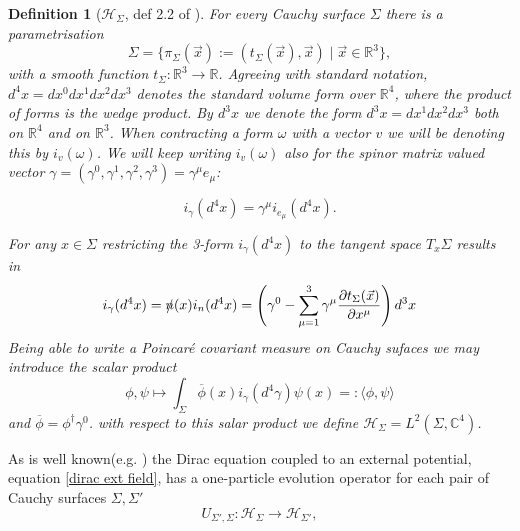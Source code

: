 \documentclass[b5paper,draft,openbib,12pt]{memoir}
\newtheorem{Def}{Definition}
\begin{document}
\begin{Def}[\(\mathcal{H}_\Sigma\), def 2.2 of \cite{deckert2016perspective}]
For every Cauchy surface \(\Sigma\) there is a parametrisation
\begin{equation}
\Sigma= \{ \pi_\Sigma(\vec{x}):=(t_\Sigma(\vec{x}),\vec{x})\mid \vec{x}\in\mathbb{R}^3\},
\end{equation}
with a smooth function 
\(t_\Sigma: \mathbb{R}^3\rightarrow \mathbb{R}\). 
Agreeing with standard notation, 
\(d^4x=dx^0dx^1dx^2dx^3\) denotes the standard volume form over 
\(\mathbb{R}^4\),
where the product of forms is 
the wedge product. By \(d^3x\) we denote 
the form \(d^3x=dx^1dx^2dx^3\) both on \(\mathbb{R}^4\) and 
on \(\mathbb{R}^3\). When contracting a form 
\(\omega\) with a vector \(v\) we 
will be denoting this by \(i_v(\omega)\). 
We will keep writing \(i_v(\omega)\) 
also for the spinor matrix valued 
vector \(\gamma= (\gamma^0,\gamma^1,\gamma^2,\gamma^3)
=\gamma^\mu e_\mu\):

\begin{equation}
i_\gamma(d^4x)=\gamma^\mu i_{e_\mu}(d^4x).
\end{equation}

For any \(x\in \Sigma\) restricting the 
3-form \(i_\gamma(d^4x)\) to the tangent space 
\(T_x\Sigma\) results in 
\begin{equation}
i_\gamma(d^4x)=\slashed{n}(x)i_n(d^4x)
= \left(\gamma^0-\sum_{\mu=1}^3 \gamma^\mu 
\frac{\partial t_\Sigma (\vec{x})}{\partial x^\mu}\right) d^3x
\end{equation}
Being able to write a Poincaré covariant measure on Cauchy sufaces we 
may introduce the scalar product 
\begin{equation}
  \phi,\psi \mapsto \int_{\Sigma} \overline{\phi}(x) i_{\gamma}(d^4\gamma) \psi(x)
  =:\langle \phi,\psi\rangle
\end{equation}
and \(\overline{\phi}=\phi^\dagger\gamma^0\).
with respect to this salar product we define 
\(\mathcal{H}_{\Sigma}=L^2(\Sigma, \mathbb{C}^4)\).
\end{Def}

As is well known(e.g. \cite{bar2007wave,ivp1}) the Dirac equation coupled to an external 
potential, equation \eqref{dirac ext field}, has a 
one-particle evolution operator for each pair of Cauchy surfaces \(\Sigma, \Sigma'\)
\begin{equation}
U_{\Sigma',\Sigma}:\mathcal{H}_\Sigma \rightarrow \mathcal{H}_{\Sigma'},
\end{equation}
\end{document}

